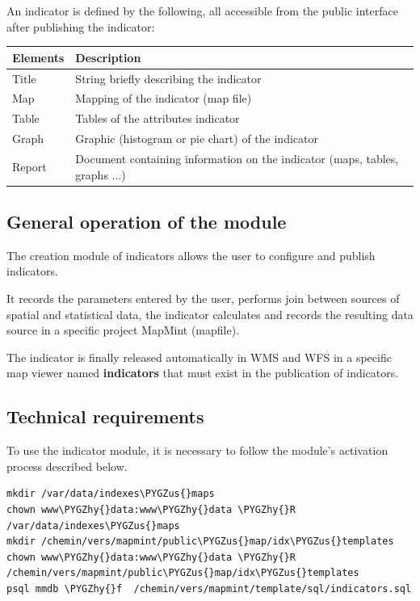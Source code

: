 \documentclass[letterpaper,10pt,english]{sphinxmanual}
\def\PYGZus{\char`\_}
\def\PYGZhy{\char`\-}
\begin{document}
An indicator is defined by the following, all accessible from the public interface after publishing the indicator:

\begin{tabulary}{\linewidth}{|L|L|}
\hline

\textbf{Elements}
 & 
\textbf{Description}
\\
\hline
Title
 & 
String briefly describing the indicator
\\
\hline
Map
 & 
Mapping of the indicator (map file)
\\
\hline
Table
 & 
Tables of the attributes indicator
\\
\hline
Graph
 & 
Graphic (histogram or pie chart) of the indicator
\\
\hline
Report
 & 
Document containing information on the indicator (maps, tables, graphs ...)
\\
\hline\end{tabulary}



\subsection{General operation of the module}
\label{indicators/presentation:fonctionnement-general-du-module}
The creation module of indicators allows the user to configure and publish indicators.

It records the parameters entered by the user, performs join between sources of spatial and statistical data, the indicator calculates and records the resulting data source in a specific project MapMint (mapfile).

The indicator is finally released automatically in WMS and WFS in a specific map viewer named \textbf{indicators} that must exist in the publication of indicators.


\subsection{Technical requirements}
\label{indicators/presentation:prerequis-techniques}
To use the indicator module, it is necessary to follow the module's activation process described below.

\begin{Verbatim}[commandchars=\\\{\}]
mkdir /var/data/indexes\PYGZus{}maps
chown www\PYGZhy{}data:www\PYGZhy{}data \PYGZhy{}R /var/data/indexes\PYGZus{}maps
mkdir /chemin/vers/mapmint/public\PYGZus{}map/idx\PYGZus{}templates
chown www\PYGZhy{}data:www\PYGZhy{}data \PYGZhy{}R /chemin/vers/mapmint/public\PYGZus{}map/idx\PYGZus{}templates
psql mmdb \PYGZhy{}f  /chemin/vers/mapmint/template/sql/indicators.sql
\end{Verbatim}
\end{document}

